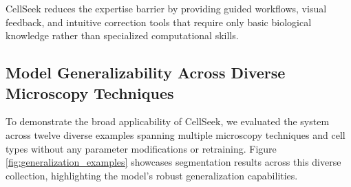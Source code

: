 \documentclass[../cellseek_paper.tex]{subfiles}
\begin{document}
CellSeek reduces the expertise barrier by providing guided workflows, visual feedback, and intuitive correction tools that require only basic biological knowledge rather than specialized computational skills.

\subsection{Model Generalizability Across Diverse Microscopy Techniques}

To demonstrate the broad applicability of CellSeek, we evaluated the system across twelve diverse examples spanning multiple microscopy techniques and cell types without any parameter modifications or retraining. Figure \ref{fig:generalization_examples} showcases segmentation results across this diverse collection, highlighting the model's robust generalization capabilities.
\end{document}
